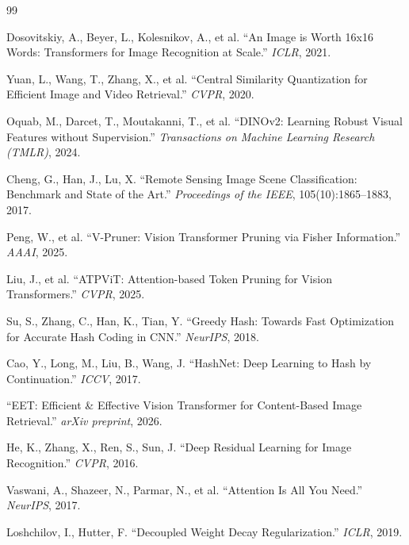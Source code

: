 \documentclass[13pt,a4paper]{article}
\begin{document}
\begin{thebibliography}{99}

Dosovitskiy, A., Beyer, L., Kolesnikov, A., et al.
``An Image is Worth 16x16 Words: Transformers for Image Recognition at Scale.''
\textit{ICLR}, 2021.

Yuan, L., Wang, T., Zhang, X., et al.
``Central Similarity Quantization for Efficient Image and Video Retrieval.''
\textit{CVPR}, 2020.

Oquab, M., Darcet, T., Moutakanni, T., et al.
``DINOv2: Learning Robust Visual Features without Supervision.''
\textit{Transactions on Machine Learning Research (TMLR)}, 2024.

Cheng, G., Han, J., Lu, X.
``Remote Sensing Image Scene Classification: Benchmark and State of the Art.''
\textit{Proceedings of the IEEE}, 105(10):1865--1883, 2017.

Peng, W., et al.
``V-Pruner: Vision Transformer Pruning via Fisher Information.''
\textit{AAAI}, 2025.

Liu, J., et al.
``ATPViT: Attention-based Token Pruning for Vision Transformers.''
\textit{CVPR}, 2025.

Su, S., Zhang, C., Han, K., Tian, Y.
``Greedy Hash: Towards Fast Optimization for Accurate Hash Coding in CNN.''
\textit{NeurIPS}, 2018.

Cao, Y., Long, M., Liu, B., Wang, J.
``HashNet: Deep Learning to Hash by Continuation.''
\textit{ICCV}, 2017.

``EET: Efficient \& Effective Vision Transformer for Content-Based Image Retrieval.''
\textit{arXiv preprint}, 2026.

He, K., Zhang, X., Ren, S., Sun, J.
``Deep Residual Learning for Image Recognition.''
\textit{CVPR}, 2016.

Vaswani, A., Shazeer, N., Parmar, N., et al.
``Attention Is All You Need.''
\textit{NeurIPS}, 2017.

Loshchilov, I., Hutter, F.
``Decoupled Weight Decay Regularization.''
\textit{ICLR}, 2019.

\end{thebibliography}


\newpage
\appendix
\end{document}
